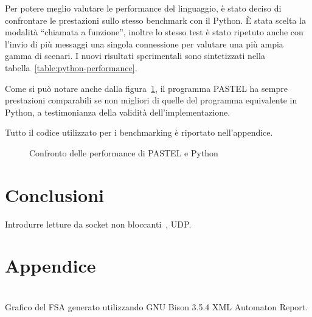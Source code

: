 \documentclass[10pt]{article}
\begin{document}
Per potere meglio valutare le performance del linguaggio, è stato deciso di confrontare le prestazioni sullo stesso benchmark con il Python. È stata scelta la modalità ``chiamata a funzione'', inoltre lo stesso test è stato ripetuto anche con l'invio di più messaggi una singola connessione per valutare una più ampia gamma di scenari. I nuovi risultati sperimentali sono sintetizzati nella tabella~\ref{table:python-performance}.

Come si può notare anche dalla figura~\ref{fig:performance-comparison}, il programma PASTEL ha sempre prestazioni comparabili se non migliori di quelle del programma equivalente in Python, a testimonianza della validità dell'implementazione.

Tutto il codice utilizzato per i benchmarking è riportato nell'appendice.



\begin{figure}
	\centering
	\caption{Confronto delle performance di PASTEL e Python}
	\label{fig:performance-comparison}
\end{figure}



\section{Conclusioni}\label{section:conclusioni}

Introdurre letture da socket non bloccanti~\cite{hall2001beej}, UDP.


\clearpage



\clearpage



\section*{Appendice}\label{section:appendix}

\begin{center}
	\centering
	\\
	Grafico del FSA generato utilizzando GNU Bison 3.5.4 XML Automaton Report.
\end{center}
\end{document}
